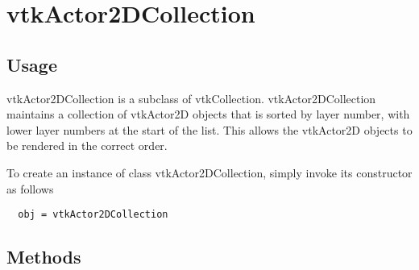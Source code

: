\section{vtkActor2DCollection}

\subsection{Usage}

 vtkActor2DCollection is a subclass of vtkCollection.  vtkActor2DCollection
 maintains a collection of vtkActor2D objects that is sorted by layer
 number, with lower layer numbers at the start of the list.  This allows
 the vtkActor2D objects to be rendered in the correct order. 

To create an instance of class vtkActor2DCollection, simply
invoke its constructor as follows
\begin{verbatim}
  obj = vtkActor2DCollection
\end{verbatim}
\subsection{Methods}

